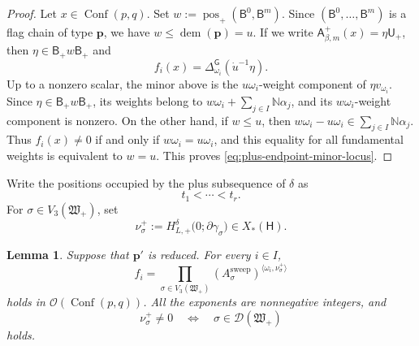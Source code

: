 \documentclass[10pt,a4paper]{article}
\newtheorem{lemma}[theorem]{Lemma}
\theoremstyle{definition}
\theoremstyle{remark}
\newcommand{\flagA}{\mathsf{A}}
\newcommand{\flagB}{\mathsf{B}}
\newcommand{\groupG}{\mathsf{G}}
\newcommand{\borelB}{\mathsf{B}}
\newcommand{\unipotentU}{\mathsf{U}}
\newcommand{\torusH}{\mathsf{H}}
\newcommand{\Conf}{\operatorname{Conf}}
\newcommand{\Dcal}{\mathcal D}
\newcommand{\fW}{\mathfrak W}
\newcommand{\pos}{\operatorname{pos}}
\begin{document}
\begin{proof}
Let \(x\in\Conf(p,q)\).  Set
\(w:=\pos_+(\flagB^0,\flagB^m)\).  Since
\((\flagB^0,\ldots,\flagB^m)\) is a flag chain of type \(\mathbf p\), we have
\(w\le\operatorname{dem}(\mathbf p)=u\).  If we write
\(\flagA_{\beta,m}^+(x)=\eta\unipotentU_+\), then
\(\eta\in\borelB_+w\borelB_+\) and
\[
 f_i(x)=\Delta_{\omega_i}^{\groupG}(\dot u^{-1}\eta).
\]
Up to a nonzero scalar, the minor above is the \(u\omega_i\)-weight component
of \(\eta v_{\omega_i}\).  Since \(\eta\in\borelB_+w\borelB_+\), its weights
belong to \(w\omega_i+\sum_{j\in I}\mathbb N\alpha_j\), and its
\(w\omega_i\)-weight component is nonzero.  On the other hand, if \(w\le u\),
then \(w\omega_i-u\omega_i\in\sum_{j\in I}\mathbb N\alpha_j\).  Thus
\(f_i(x)\ne0\) if and only if \(w\omega_i=u\omega_i\), and this equality for
all fundamental weights is equivalent to \(w=u\).  This proves
\eqref{eq:plus-endpoint-minor-locus}.
\end{proof}

Write the positions occupied by the plus subsequence of \(\delta\) as
\[
 t_1<\cdots<t_r.
\]
For \(\sigma\in V_3(\fW_+)\), set
\begin{equation}
 \nu_\sigma^+
 :=H_{L,+}^{\delta}\bigl(0;\partial\gamma_\sigma\bigr)
 \in X_*(\torusH).
 \label{eq:plus-terminal-coweight}
\end{equation}

\begin{lemma}
\label{lem:plus-endpoint-minor-monomial}
Suppose that \(\mathbf p'\) is reduced.  For every \(i\in I\),
\begin{equation}
 f_i
 =\prod_{\sigma\in V_3(\fW_+)}
   \left(A_\sigma^{\mathrm{sweep}}\right)^{
    \langle\omega_i,\nu_\sigma^+\rangle}
 \label{eq:plus-endpoint-minor-monomial}
\end{equation}
holds in \(\mathcal O(\Conf(p,q))\).  All the exponents are nonnegative
integers, and
\begin{equation}
 \nu_\sigma^+\ne0
 \quad\Longleftrightarrow\quad
 \sigma\in\Dcal(\fW_+)
 \label{eq:plus-terminal-coweight-support}
\end{equation}
holds.
\end{lemma}
\end{document}
